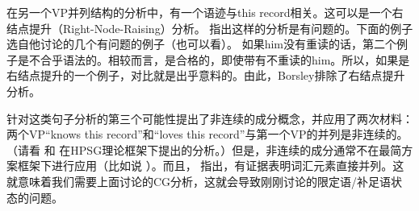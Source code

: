 在另一个VP并列结构的分析中，有一个语迹与this record相关。这可以是一个右结点提升（Right-Node-Raising）分析。 \citet{Borsley2005a}指出这样的分析是有问题的。下面的例子选自他讨论的几个有问题的例子（也可以看\citealp[]{Bresnan74a-u}）。
\eal
{}
\zl
如果him没有重读的话，第二个例子是不合乎语法的。相较而言，是合格的，即使带有不重读的him。所以，如果是右结点提升的一个例子，对比就是出乎意料的。由此，Borsley排除了右结点提升分析。

针对这类句子分析的第三个可能性提出了非连续的成分概念，并应用了两次材料：两个VP“knows this record”和“loves this record”与第一个VP的并列是非连续的。（请看 和 在HPSG理论框架下提出的分析。）但是，非连续的成分通常不在最简方案框架下进行应用（比如说 ）。而且， \citet{Abeille2006a}指出，有证据表明词汇元素直接并列。这就意味着我们需要上面讨论的CG分析，这就会导致刚刚讨论的限定语/补足语状态的问题。

